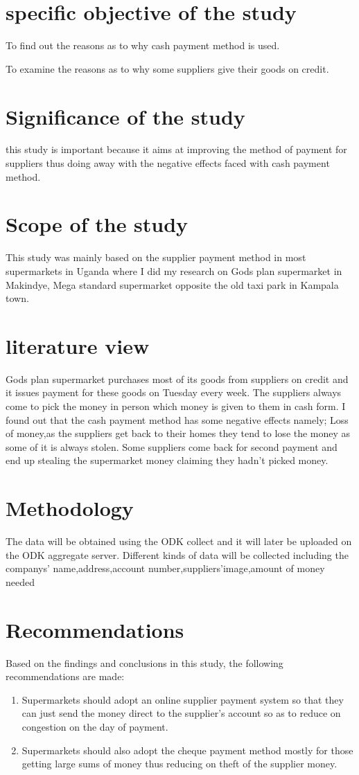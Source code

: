 \documentclass[12pt,]{article}
\begin{document}
\section{specific objective of the study}

To find out the reasons as to why cash payment method is used.

To examine the reasons as to why some suppliers give their goods on credit.


\section{Significance of the study}
this study is important because it aims at improving the method of payment for suppliers thus doing away with the negative effects faced with cash payment method.
\section{Scope of the study}
This study was mainly based on the supplier payment method in most supermarkets in Uganda where I did my research on Gods plan supermarket in Makindye, Mega standard supermarket opposite the old taxi park in Kampala town.
\section{literature view}
Gods plan supermarket purchases most of its goods from suppliers on credit and it issues payment for these goods on Tuesday every week. The suppliers always come to pick the money in person which money is given to them in cash form.
I found out that the cash payment method has some negative effects namely;
Loss of money,as the suppliers get back to their homes they tend to lose the money as some of it is always stolen.
Some suppliers come back for second payment and end up stealing the supermarket money claiming they hadn't picked money.
\section{Methodology}
The data will be obtained using the ODK collect and it will later be uploaded on the ODK aggregate server.
Different kinds of data will be collected including the companys' name,address,account number,suppliers'image,amount of money needed
\section{Recommendations }
Based on the findings and conclusions in this study, the following recommendations are made:

\begin{enumerate}

\item Supermarkets should adopt an online supplier payment system so that they can just send the money direct to the supplier’s account so as to reduce on congestion on the day of payment.
\item Supermarkets should also adopt the cheque payment method mostly for those getting large sums of money thus reducing on theft of the supplier money.


\end{enumerate}
\end{document}
